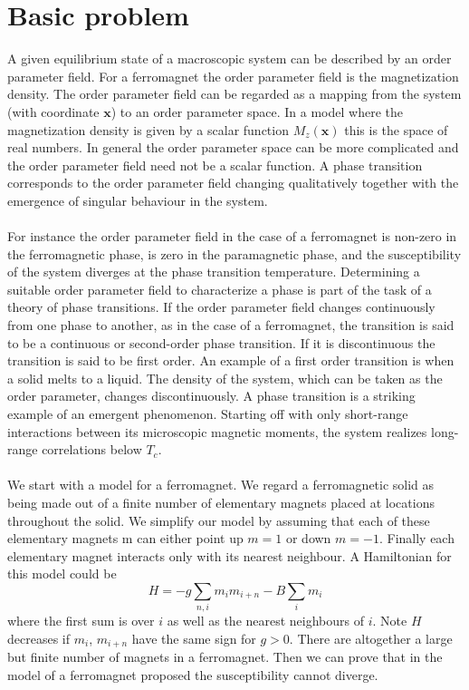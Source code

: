 \section{Basic problem}
A given equilibrium state of a macroscopic system can be described by an order parameter field. For a ferromagnet the order parameter field is the magnetization density. 
The order parameter field can be regarded as a mapping from the system (with coordinate $\bm{x}$) to an order parameter space. In a model where the magnetization density is given by a scalar function $M_z(\bm{x})$ this is the space of real numbers. In general the order parameter space can be more complicated and the order parameter field need not be a scalar function.
A phase transition corresponds to the order parameter field
changing qualitatively together with the emergence of singular behaviour in the system.
\\ \\
For instance the order parameter field in the case of a ferromagnet is non-zero in the ferromagnetic phase, is zero in the paramagnetic phase, and the susceptibility of the system diverges at the phase transition temperature. 
Determining a suitable order parameter field to characterize a phase is part of the task of a theory of phase transitions. If the order parameter field changes continuously from one phase to another, as in the case of a ferromagnet, the transition is said to be a continuous or second-order phase transition. If it is discontinuous the transition is said to be first order. 
An example of a first order transition is when a solid melts
to a liquid. The density of the system, which can be taken as the order parameter, changes discontinuously. A phase transition is a striking example of an emergent phenomenon. Starting off with only short-range interactions between its microscopic magnetic moments, the system realizes long-range correlations below $T_c$.
\\ \\
We start with a model for a ferromagnet. We regard a ferromagnetic solid as being made out of a finite number of elementary magnets placed at locations throughout the solid.
We simplify our model by assuming that each of these elementary magnets m can either point up $m = 1$ or down $m = -1$. Finally each elementary magnet interacts only with its nearest neighbour. A Hamiltonian for this model could be
\[H = -g\sum_{n,i}m_im_{i+n} - B\sum_i m_i\]
where the first sum is over $i$ as well as the nearest neighbours of $i$. Note $H$ decreases if $m_i$, $m_{i+n}$ have the same sign for $g > 0$. There are altogether a large but finite number of magnets in a ferromagnet. Then we can prove that in the model of a ferromagnet proposed the susceptibility cannot diverge. 
